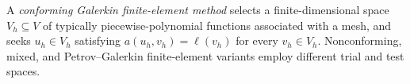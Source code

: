 
A \emph{conforming Galerkin finite-element method} selects a finite-dimensional space $V_h\subseteq V$ of typically piecewise-polynomial functions associated with a mesh, and seeks $u_h\in V_h$ satisfying $a(u_h,v_h)=\ell(v_h)$ for every $v_h\in V_h$. Nonconforming, mixed, and Petrov--Galerkin finite-element variants employ different trial and test spaces.

